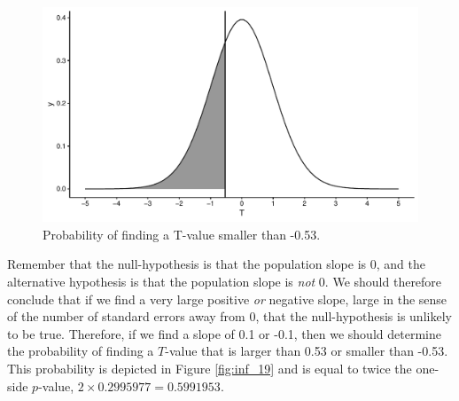 \documentclass[]{book}\usepackage[]{graphicx}\usepackage[]{color}
\makeatletter
\def\maxwidth{ %
  \ifdim\Gin@nat@width>\linewidth
    \linewidth
  \else
    \Gin@nat@width
  \fi
}
\newenvironment{knitrout}{}{} %
\makeatother
\begin{document}
\begin{knitrout}
\color{fgcolor}\begin{figure}

{\centering \includegraphics[width=\maxwidth]{figure/inf_18-1} 

}

\caption[Probability of finding a T-value smaller than -0.53]{Probability of finding a T-value smaller than -0.53.}\label{fig:inf_18}
\end{figure}


\end{knitrout}

Remember that the null-hypothesis is that the population slope is 0, and the alternative hypothesis is that the population slope is \textit{not} 0. We should therefore conclude that if we find a very large positive \textit{or} negative slope, large in the sense of the number of standard errors away from 0, that the null-hypothesis is unlikely to be true. Therefore, if we find a slope of 0.1 or -0.1, then we should determine the probability of finding a $T$-value that is larger than 0.53 or smaller than -0.53. This probability is depicted in Figure \ref{fig:inf_19} and is equal to twice the one-side $p$-value, $2 \times 0.2995977=0.5991953$.
\end{document}
